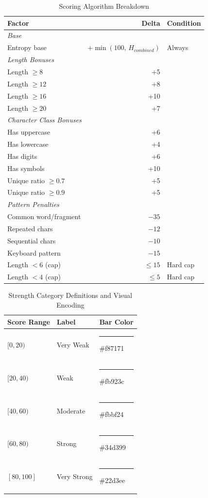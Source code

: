 \documentclass[12pt,a4paper]{article}
\begin{document}
\begin{table}[H]
\centering
\begin{tabular}{lrl}
\toprule
\textbf{Factor} & \textbf{Delta} & \textbf{Condition} \\
\midrule
\multicolumn{3}{l}{\textit{Base}} \\
Entropy base    & $+\min(100,\, H_{combined})$ & Always \\
\midrule
\multicolumn{3}{l}{\textit{Length Bonuses}} \\
Length $\geq 8$  & +5  & \\
Length $\geq 12$ & +8  & \\
Length $\geq 16$ & +10 & \\
Length $\geq 20$ & +7  & \\
\midrule
\multicolumn{3}{l}{\textit{Character Class Bonuses}} \\
Has uppercase    & +6  & \\
Has lowercase    & +4  & \\
Has digits       & +6  & \\
Has symbols      & +10 & \\
Unique ratio $\geq 0.7$ & +5 & \\
Unique ratio $\geq 0.9$ & +5 & \\
\midrule
\multicolumn{3}{l}{\textit{Pattern Penalties}} \\
Common word/fragment & $-35$ & \\
Repeated chars   & $-12$ & \\
Sequential chars & $-10$ & \\
Keyboard pattern & $-15$ & \\
Length $< 6$ (cap) & $\leq 15$ & Hard cap \\
Length $< 4$ (cap) & $\leq 5$  & Hard cap \\
\bottomrule
\end{tabular}
\caption{Scoring Algorithm Breakdown}
\end{table}

\begin{table}[H]
\centering
\begin{tabular}{lll}
\toprule
\textbf{Score Range} & \textbf{Label} & \textbf{Bar Color} \\
\midrule
$[0, 20)$   & Very Weak   & \textcolor{dangerred}{\rule{2cm}{8pt}} \#f87171 \\
$[20, 40)$  & Weak        & \textcolor{orange}{\rule{2cm}{8pt}} \#fb923c \\
$[40, 60)$  & Moderate    & \textcolor{warningyellow}{\rule{2cm}{8pt}} \#fbbf24 \\
$[60, 80)$  & Strong      & \textcolor{successgreen}{\rule{2cm}{8pt}} \#34d399 \\
$[80, 100]$ & Very Strong & \textcolor{accentcyan}{\rule{2cm}{8pt}} \#22d3ee \\
\bottomrule
\end{tabular}
\caption{Strength Category Definitions and Visual Encoding}
\end{table}
\end{document}
